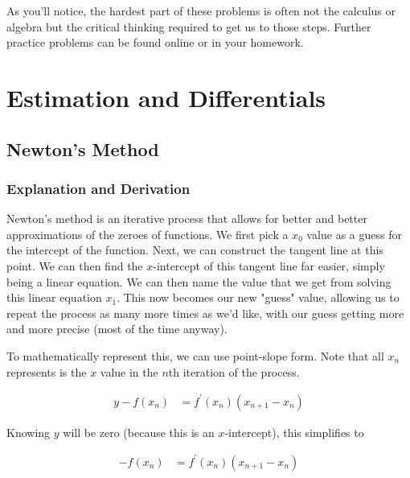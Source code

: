 As you'll notice, the hardest part of these problems is often not the calculus or algebra but the critical thinking required to get us to those steps. Further practice problems can be found online or in your homework.

\section{Estimation and Differentials}

\subsection{Newton's Method}

\subsubsection{Explanation and Derivation}

Newton's method is an iterative process that allows for better and better approximations of the zeroes of functions. We first pick a \( x_0 \) value as a guess for the intercept of the function. Next, we can construct the tangent line at this point. We can then find the \( x \)-intercept of this tangent line far easier, simply being a linear equation. We can then name the value that we get from solving this linear equation \( x_1 \). This now becomes our new "guess" value, allowing us to repeat the process as many more times as we'd like, with our guess getting more and more precise (most of the time anyway).

\begin{figure}[H]
    \centering
    
\end{figure}

To mathematically represent this, we can use point-slope form. Note that all \( x_n \) represents is the \( x \) value in the \( n \)th iteration of the process.

\begin{align*}
    y - f \left( x_n \right) &= f^\prime \left( x_n \right) \left( x_{n + 1} - x_n \right)
\end{align*}

Knowing \( y \) will be zero (because this is an \( x \)-intercept), this simplifies to

\begin{align*}
    - f\left( x_n \right) &= f^\prime \left( x_n \right) \left( x_{n + 1} - x_n \right)
\end{align*}


